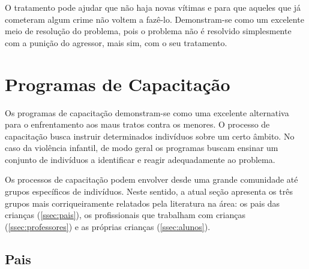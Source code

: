 O tratamento pode ajudar que não haja novas vítimas e para que aqueles que já cometeram algum crime não voltem a fazê-lo. Demonstram-se como um excelente meio de resolução do problema, pois o problema não é resolvido simplesmente com a punição do agressor, mais sim, com o seu tratamento. 



\section{Programas de Capacitação}\label{sec:programas}




Os programas de capacitação demonstram-se como uma excelente alternativa para o enfrentamento aos maus tratos contra os menores. O processo de capacitação busca instruir determinados indivíduos sobre um certo âmbito. No caso da violência infantil, de modo geral os programas buscam ensinar um conjunto de indivíduos a identificar e reagir adequadamente ao problema. 

Os processos de capacitação podem envolver desde uma grande comunidade até grupos específicos de indivíduos. Neste sentido, a atual seção apresenta os três grupos mais corriqueiramente relatados pela literatura na área: os pais das crianças (\autoref{ssec:pais}), os profissionais que trabalham com crianças (\autoref{ssec:professores}) e as próprias crianças (\autoref{ssec:alunos}).




\subsection{Pais}\label{ssec:pais}




